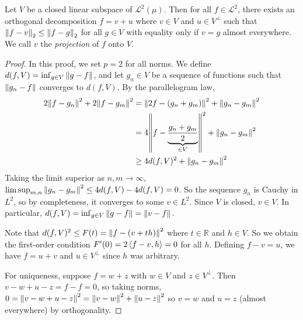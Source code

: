 \begin{theorem}
	Let \( V \) be a closed linear subspace of \( \mathcal L^2(\mu) \).
	Then for all \( f \in \mathcal L^2 \), there exists an orthogonal decomposition \( f = v + u \) where \( v \in V \) and \( u \in V^\perp \) such that \( \norm{f - v}_2 \leq \norm{f - g}_2 \) for all \( g \in V \) with equality only if \( v = g \) almost everywhere.
	We call \( v \) the \emph{projection} of \( f \) onto \( V \).
\end{theorem}
\begin{proof}
	In this proof, we set \( p = 2 \) for all norms.
	We define \( d(f,V) = \inf_{g \in V} \norm{g - f} \), and let \( g_n \in V \) be a sequence of functions such that \( \norm{g_n - f} \) converges to \( d(f,V) \).
	By the parallelogram law,
	\begin{align*}
		2\norm{f - g_n}^2 + 2\norm{f - g_m}^2 &= \norm{2f - (g_n + g_m)}^2 + \norm{g_n - g_m}^2 \\
		&= 4 \norm{f - \underbrace{\frac{g_n + g_m}{2}}_{\in V}}^2 + \norm{g_n - g_m}^2 \\
		&\geq 4 d(f,V)^2 + \norm{g_n - g_m}^2
	\end{align*}
	Taking the limit superior as \( n, m \to \infty \), \( \limsup_{m,n} \norm{g_n - g_m}^2 \leq 4d(f,V) - 4d(f,V) = 0 \).
	So the sequence \( g_n \) is Cauchy in \( L^2 \), so by completeness, it converges to some \( v \in L^2 \).
	Since \( V \) is closed, \( v \in V \).
	In particular, \( d(f,V) = \inf_{g \in V} \norm{g - f} = \norm{v - f} \).

	Note that \( d(f,V)^2 \leq F(t) = \norm{f - (v+th)}^2 \) where \( t \in \mathbb R \) and \( h \in V \).
	So we obtain the first-order condition \( F'(0) = 2\left\langle{f - v, h}\right\rangle = 0 \) for all \( h \).
	Defining \( f - v = u \), we have \( f = u + v \) and \( u \in V^\perp \) since \( h \) was arbitrary.

	For uniqueness, suppose \( f = w + z \) with \( w \in V \) and \( z \in V^\perp \).
	Then \( v - w + u - z = f - f = 0 \), so taking norms, \( 0 = \norm{v - w + u - z}^2 = \norm{v - w}^2 + \norm{u - z}^2 \) so \( v = w \) and \( u = z \) (almost everywhere) by orthogonality.
\end{proof}

